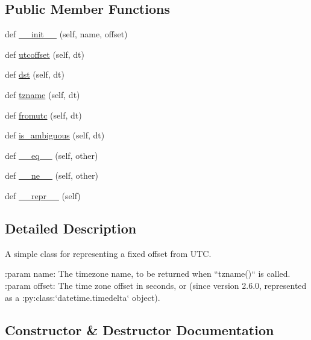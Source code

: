 \subsection*{Public Member Functions}
\begin{DoxyCompactItemize}
\item 
def \hyperlink{classdateutil_1_1tz_1_1tz_1_1tzoffset_a5f7e34317f8e82dcc65803012a27cd13}{\+\_\+\+\_\+init\+\_\+\+\_\+} (self, name, offset)
\item 
def \hyperlink{classdateutil_1_1tz_1_1tz_1_1tzoffset_a94e955d77722266ede297e8cc4e38bab}{utcoffset} (self, dt)
\item 
def \hyperlink{classdateutil_1_1tz_1_1tz_1_1tzoffset_a1be7ac9fc032a297482d912fcae3b87e}{dst} (self, dt)
\item 
def \hyperlink{classdateutil_1_1tz_1_1tz_1_1tzoffset_a8ede427c02f134468e815bb32fac67d7}{tzname} (self, dt)
\item 
def \hyperlink{classdateutil_1_1tz_1_1tz_1_1tzoffset_ae5f38bd8ac57c3589f5d1bf4ee389d37}{fromutc} (self, dt)
\item 
def \hyperlink{classdateutil_1_1tz_1_1tz_1_1tzoffset_a0e4c476c305738319226ef41c67f618a}{is\+\_\+ambiguous} (self, dt)
\item 
def \hyperlink{classdateutil_1_1tz_1_1tz_1_1tzoffset_a7b5b3267a9135614399825370f2fd3c1}{\+\_\+\+\_\+eq\+\_\+\+\_\+} (self, other)
\item 
def \hyperlink{classdateutil_1_1tz_1_1tz_1_1tzoffset_aaddac8452718e73fb5c194c6a9be95bb}{\+\_\+\+\_\+ne\+\_\+\+\_\+} (self, other)
\item 
def \hyperlink{classdateutil_1_1tz_1_1tz_1_1tzoffset_a93109f2c1e6df5f0885a5d90f32f6618}{\+\_\+\+\_\+repr\+\_\+\+\_\+} (self)
\end{DoxyCompactItemize}


\subsection{Detailed Description}
\begin{DoxyVerb}A simple class for representing a fixed offset from UTC.

:param name:
    The timezone name, to be returned when ``tzname()`` is called.
:param offset:
    The time zone offset in seconds, or (since version 2.6.0, represented
    as a :py:class:`datetime.timedelta` object).
\end{DoxyVerb}
 

\subsection{Constructor \& Destructor Documentation}
\mbox{\label{classdateutil_1_1tz_1_1tz_1_1tzoffset_a5f7e34317f8e82dcc65803012a27cd13}} 
